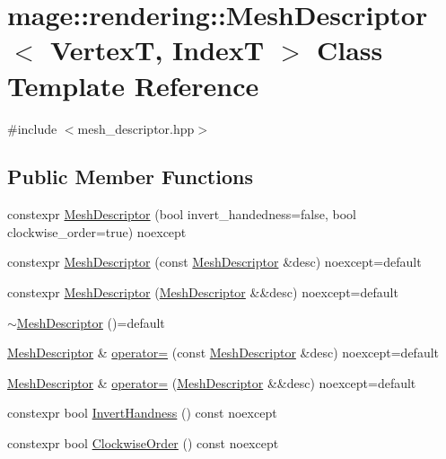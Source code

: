 \hypertarget{classmage_1_1rendering_1_1_mesh_descriptor}{}\section{mage\+:\+:rendering\+:\+:Mesh\+Descriptor$<$ VertexT, IndexT $>$ Class Template Reference}
\label{classmage_1_1rendering_1_1_mesh_descriptor}


{\ttfamily \#include $<$mesh\+\_\+descriptor.\+hpp$>$}

\subsection*{Public Member Functions}
\begin{DoxyCompactItemize}
\item 
constexpr \mbox{\hyperlink{classmage_1_1rendering_1_1_mesh_descriptor_a1b0ebe38d5591dda224370a7533f0c13}{Mesh\+Descriptor}} (bool invert\+\_\+handedness=false, bool clockwise\+\_\+order=true) noexcept
\item 
constexpr \mbox{\hyperlink{classmage_1_1rendering_1_1_mesh_descriptor_ad46be4da19cfa33f0731f371b7ebbe43}{Mesh\+Descriptor}} (const \mbox{\hyperlink{classmage_1_1rendering_1_1_mesh_descriptor}{Mesh\+Descriptor}} \&desc) noexcept=default
\item 
constexpr \mbox{\hyperlink{classmage_1_1rendering_1_1_mesh_descriptor_a929e3b4b29e421f921e5d17d0a382275}{Mesh\+Descriptor}} (\mbox{\hyperlink{classmage_1_1rendering_1_1_mesh_descriptor}{Mesh\+Descriptor}} \&\&desc) noexcept=default
\item 
\mbox{\hyperlink{classmage_1_1rendering_1_1_mesh_descriptor_a0948d279801d1b4eb7eb5dca8b0f86ea}{$\sim$\+Mesh\+Descriptor}} ()=default
\item 
\mbox{\hyperlink{classmage_1_1rendering_1_1_mesh_descriptor}{Mesh\+Descriptor}} \& \mbox{\hyperlink{classmage_1_1rendering_1_1_mesh_descriptor_a5181764e459caf5356c6d4b4b5268c1d}{operator=}} (const \mbox{\hyperlink{classmage_1_1rendering_1_1_mesh_descriptor}{Mesh\+Descriptor}} \&desc) noexcept=default
\item 
\mbox{\hyperlink{classmage_1_1rendering_1_1_mesh_descriptor}{Mesh\+Descriptor}} \& \mbox{\hyperlink{classmage_1_1rendering_1_1_mesh_descriptor_aa6094035cdaff6213b7156cead0c0381}{operator=}} (\mbox{\hyperlink{classmage_1_1rendering_1_1_mesh_descriptor}{Mesh\+Descriptor}} \&\&desc) noexcept=default
\item 
constexpr bool \mbox{\hyperlink{classmage_1_1rendering_1_1_mesh_descriptor_a0fa7557aa67c69a7978f965bdc913686}{Invert\+Handness}} () const noexcept
\item 
constexpr bool \mbox{\hyperlink{classmage_1_1rendering_1_1_mesh_descriptor_a71ea285cfb0bc3f748038de570e9084e}{Clockwise\+Order}} () const noexcept
\end{DoxyCompactItemize}
